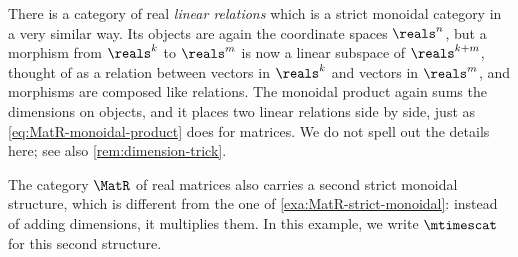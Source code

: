 \begin{remark}
    \label{rem:LinRel-strict-monoidal}
    There is a category of real \emph{linear relations} which is a strict monoidal category in a very similar way.
    Its objects are again the coordinate spaces $\reals^n$, but a morphism from $\reals^k$ to $\reals^m$ is now a linear subspace of $\reals^{k+m}$, thought of as a relation between vectors in $\reals^k$ and vectors in $\reals^m$, and morphisms are composed like relations.
    The monoidal product again sums the dimensions on objects, and it places two linear relations side by side, just as \cref{eq:MatR-monoidal-product} does for matrices.
    We do not spell out the details here; see also \cref{rem:dimension-trick}.
\end{remark}

\begin{example}
    \label{exa:MatR-Kronecker-strict-monoidal}
    The category $\MatR$ of real matrices also carries a second strict monoidal structure, which is different from the one of \cref{exa:MatR-strict-monoidal}: instead of adding dimensions, it multiplies them.
    In this example, we write $\mtimescat$ for this second structure.


\end{example}
